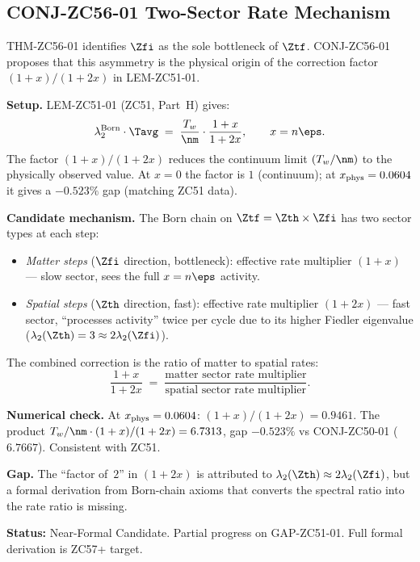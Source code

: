 \documentclass[12pt, a4paper]{article}
\begin{document}
\subsection{CONJ-ZC56-01 \quad Two-Sector Rate Mechanism}
\label{sec:conj01}

THM-ZC56-01 identifies $\Zfi$ as the sole bottleneck of $\Ztf$.
CONJ-ZC56-01 proposes that this asymmetry is the physical origin
of the correction factor $(1+x)/(1+2x)$ in LEM-ZC51-01.


\begin{derivedbox}[title={CONJ-ZC56-01: Two-Sector Rate Asymmetry
  Produces $(1+x)/(1+2x)$ (Near-Formal Candidate, $R_0$)}]
\textbf{Setup.}
LEM-ZC51-01 (ZC51, Part~H) gives:
\begin{equation}
  \lambda_2^{\rm Born}\cdot\Tavg
  \;=\; \frac{T_w}{\nm}\cdot\frac{1+x}{1+2x},
  \qquad x=n\eps.
  \label{eq:ZC51-product}
\end{equation}
The factor $(1+x)/(1+2x)$ reduces the continuum limit
$(T_w/\nm)$ to the physically observed value.  At $x=0$
the factor is $1$ (continuum); at $x_{\rm phys}=0.0604$
it gives a $-0.523\%$ gap (matching ZC51 data).

\medskip
\textbf{Candidate mechanism.}
The Born chain on $\Ztf=\Zth\times\Zfi$ has two sector types
at each step:
\begin{itemize}[leftmargin=2em, noitemsep]
\item \emph{Matter steps} ($\Zfi$ direction, bottleneck):
  effective rate multiplier $(1+x)$ --- slow sector, sees the
  full $x=n\eps$ activity.
\item \emph{Spatial steps} ($\Zth$ direction, fast):
  effective rate multiplier $(1+2x)$ --- fast sector, ``processes
  activity'' twice per cycle due to its higher Fiedler eigenvalue
  ($\lambda_2(\Zth)=3\approx2\lambda_2(\Zfi)$).
\end{itemize}
The combined correction is the ratio of matter to spatial rates:
\[
  \frac{1+x}{1+2x}
  \;=\; \frac{\text{matter sector rate multiplier}}%
  {\text{spatial sector rate multiplier}}.
\]

\medskip
\textbf{Numerical check.}
At $x_{\rm phys}=0.0604$: $(1+x)/(1+2x)=0.9461$.
The product $T_w/\nm\cdot(1+x)/(1+2x)=6.7313$,
gap $-0.523\%$ vs CONJ-ZC50-01 ($6.7667$). Consistent with ZC51.

\medskip
\textbf{Gap.}
The ``factor of~$2$'' in $(1+2x)$ is attributed to
$\lambda_2(\Zth)\approx2\lambda_2(\Zfi)$, but a formal
derivation from Born-chain axioms that converts the spectral
ratio into the rate ratio is missing.

\medskip
\textbf{Status:} Near-Formal Candidate.  Partial progress on
GAP-ZC51-01.  Full formal derivation is ZC57+ target.
\end{derivedbox}
\end{document}
